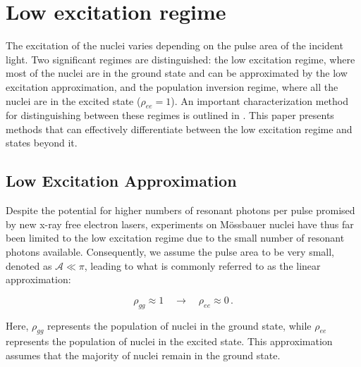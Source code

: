 \section{Low excitation regime}
The excitation of the nuclei varies depending on the pulse area of the incident light. Two significant regimes are distinguished: the low excitation regime, where most of the nuclei are in the ground state and can be approximated by the low excitation approximation, and the population inversion regime, where all the nuclei are in the excited state ($\rho_{ee} = 1$). An important characterization method for distinguishing between these regimes is outlined in \cite{wolff2023characterization}. This paper presents methods that can effectively differentiate between the low excitation regime and states beyond it.\\

\subsection{Low Excitation Approximation}
Despite the potential for higher numbers of resonant photons per pulse promised by new x-ray free electron lasers, experiments on Mössbauer nuclei have thus far been limited to the low excitation regime due to the small number of resonant photons available. Consequently, we assume the pulse area to be very small, denoted as $\mathcal{A} \ll \pi$, leading to what is commonly referred to as the linear approximation:

\begin{equation}
\rho_{gg} \approx 1 \quad \longrightarrow \quad \rho_{ee} \approx 0 \, .
\end{equation}

Here, $\rho_{gg}$ represents the population of nuclei in the ground state, while $\rho_{ee}$ represents the population of nuclei in the excited state. This approximation assumes that the majority of nuclei remain in the ground state.\\


